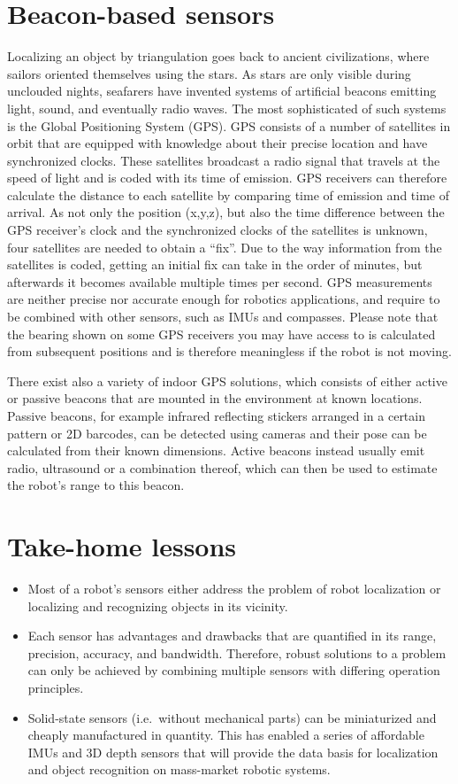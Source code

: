 \section{Beacon-based sensors}

Localizing an object by triangulation goes back to ancient civilizations, where sailors oriented themselves using the stars. As stars are only visible during unclouded nights, seafarers have invented systems of artificial beacons emitting light, sound, and eventually radio waves. The most sophisticated of such systems is the Global Positioning System (GPS). GPS consists of a number of satellites in orbit that are equipped with knowledge about their precise location and have synchronized clocks. These satellites broadcast a radio signal that travels at the speed of light and is coded with its time of emission. GPS receivers can therefore calculate the distance to each satellite by comparing time of emission and time of arrival. As not only the position (x,y,z), but also the time difference between the GPS receiver's clock and the synchronized clocks of the satellites is unknown, four satellites are needed to obtain a ``fix''. Due to the way information from the satellites is coded, getting an initial fix can take in the order of minutes, but afterwards it becomes available multiple times per second. GPS measurements are neither precise nor accurate enough for robotics applications, and require to be combined with other sensors, such as IMUs and compasses. Please note that the bearing shown on some GPS receivers you may have access to is calculated from subsequent positions and is therefore meaningless if the robot is not moving.

There exist also a variety of indoor GPS solutions, which consists of either active or passive beacons that are mounted in the environment at known locations. Passive beacons, for example infrared reflecting stickers arranged in a certain pattern or 2D barcodes, can be detected using cameras and their pose can be calculated from their known dimensions. Active beacons instead usually emit radio, ultrasound or a combination thereof, which can then be used to estimate the robot's range to this beacon.

\section*{Take-home lessons}
\begin{itemize}
\item Most of a robot's sensors either address the problem of robot localization or localizing and recognizing objects in its vicinity.
\item Each sensor has advantages and drawbacks that are quantified in its range, precision, accuracy, and bandwidth. Therefore, robust solutions to a problem can only be achieved by combining multiple sensors with differing operation principles.
\item Solid-state sensors (i.e.\ without mechanical parts) can be miniaturized and cheaply manufactured in quantity. This has enabled a series of affordable IMUs and 3D depth sensors that will provide the data basis for localization and object recognition on mass-market robotic systems.
\end{itemize}

